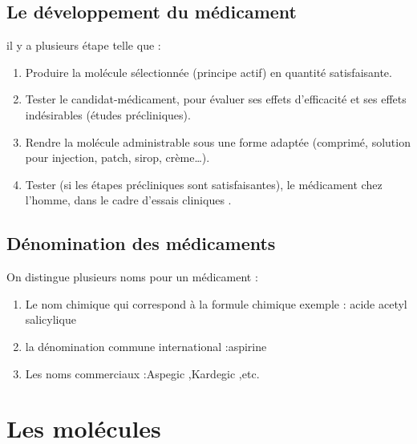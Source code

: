 \documentclass[12pt]{report}
\begin{document}
\subsection{Le développement du médicament}
 il y a plusieurs étape telle que :
\begin{enumerate}
\item Produire la molécule sélectionnée (principe actif) en quantité satisfaisante.
\item Tester le candidat-médicament, pour évaluer ses effets d'efficacité et ses effets indésirables (études précliniques). 
\item Rendre la molécule administrable sous une forme adaptée (comprimé, solution pour injection, patch, sirop, crème…).
\item Tester (si les étapes précliniques sont satisfaisantes), le médicament chez l'homme, dans le cadre d'essais cliniques \cite{ref7}.
\end{enumerate}
\subsection{Dénomination des médicaments}
On distingue plusieurs noms pour un médicament :
\begin{enumerate}
\item Le nom chimique qui correspond à la formule chimique exemple : acide acetyl salicylique
\item la dénomination commune international :aspirine
\item Les noms commerciaux :Aspegic ,Kardegic ,etc.
\end{enumerate}
\newpage
\section{Les molécules}
\end{document}
